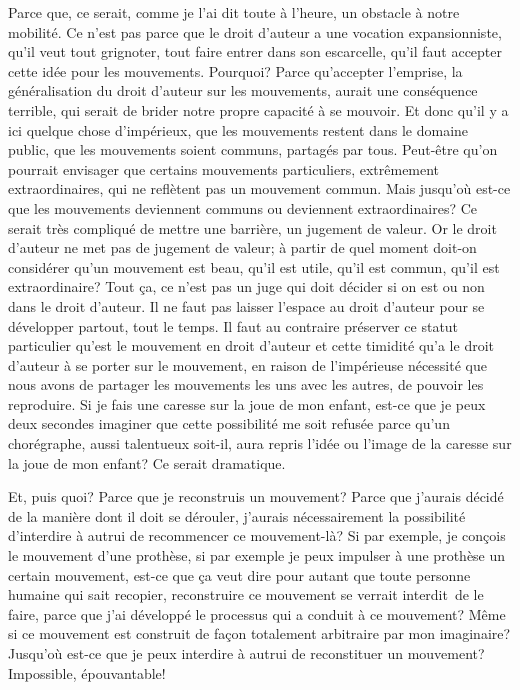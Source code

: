 {Parce que, ce serait, comme je l'ai dit toute \`a l'heure, un
obstacle \`a notre mobilit\'e. Ce n'est pas parce que le droit d'auteur
a une vocation expansionniste, qu'il veut tout grignoter, tout faire
entrer dans son escarcelle, qu'il faut accepter cette id\'ee pour les
mouvements. Pourquoi? Parce qu'accepter l'emprise, la
g\'en\'eralisation du droit d'auteur sur les mouvements, aurait une
cons\'equence terrible, qui serait de brider notre propre capacit\'e
\`a se mouvoir. Et donc qu'il y a ici quelque chose d'imp\'erieux, que
les mouvements restent dans le domaine public, que les mouvements
soient communs, partag\'es par tous. Peut{}-\^etre qu'on pourrait
envisager que certains mouvements particuliers, extr\^emement
extraordinaires, qui ne refl\`etent pas un mouvement commun. Mais
jusqu'o\`u est{}-ce que les mouvements deviennent communs ou deviennent
extraordinaires? Ce serait tr\`es compliqu\'e de mettre une barri\`ere,
un jugement de valeur. Or le droit d'auteur ne met pas de jugement de
valeur; \`a partir de quel moment doit{}-on consid\'erer qu'un
mouvement est beau, qu'il est utile, qu'il est commun, qu'il est
extraordinaire? Tout \c{c}a, ce n'est pas un juge qui doit d\'ecider si
on est ou non dans le droit d'auteur. Il ne faut pas laisser l'espace
au droit d'auteur pour se d\'evelopper partout, tout le temps. Il faut
au contraire pr\'eserver ce statut particulier qu'est le mouvement en
droit d'auteur et cette timidit\'e qu'a le droit d'auteur \`a se porter
sur le mouvement, en raison de l'imp\'erieuse n\'ecessit\'e que nous
avons de partager les mouvements les uns avec les autres, de pouvoir
les reproduire. Si je fais une caresse sur la joue de mon enfant,
est{}-ce que je peux deux secondes imaginer que cette possibilit\'e me
soit refus\'ee parce qu'un chor\'egraphe, aussi talentueux soit{}-il,
aura repris l'id\'ee ou l'image de la caresse sur la joue de mon
enfant? Ce serait dramatique.\par

Et, puis quoi? Parce que je reconstruis un mouvement? Parce que j'aurais
d\'ecid\'e de la mani\`ere dont il doit se d\'erouler, j'aurais
n\'ecessairement la possibilit\'e d'interdire \`a autrui de recommencer
ce mouvement{}-l\`a? Si par exemple, je con\c{c}ois le mouvement d'une
proth\`ese, si par exemple je peux impulser \`a une proth\`ese un
certain mouvement, est{}-ce que \c{c}a veut dire pour autant que toute
personne humaine qui sait recopier, reconstruire ce mouvement se
verrait interdit~de le faire, parce que j'ai d\'evelopp\'e le processus
qui a conduit \`a ce mouvement? M\^eme si ce mouvement est construit de
fa\c{c}on totalement arbitraire par mon imaginaire? Jusqu'o\`u est{}-ce
que je peux interdire \`a autrui de reconstituer un mouvement?
Impossible, \'epouvantable!\par

}
